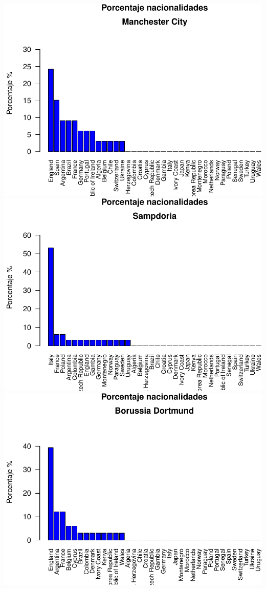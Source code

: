 \documentclass[]{article}
\begin{document}
\includegraphics{taller_FIFA_SOLUCION_files/figure-latex/unnamed-chunk-9-4.pdf}
\includegraphics{taller_FIFA_SOLUCION_files/figure-latex/unnamed-chunk-9-5.pdf}
\includegraphics{taller_FIFA_SOLUCION_files/figure-latex/unnamed-chunk-9-6.pdf}
\end{document}
